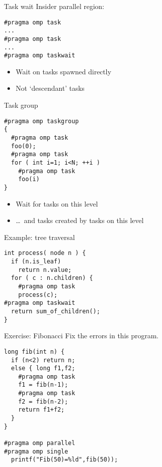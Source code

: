 \begin{numberedframe}{Task wait}
Insider parallel region:
\begin{lstlisting}
#pragma omp task
...
#pragma omp task
...
#pragma omp taskwait
\end{lstlisting}
  \begin{itemize}
  \item Wait on tasks spawned directly
  \item Not `descendant' tasks
  \end{itemize}
\end{numberedframe}

\begin{numberedframe}{Task group}
\begin{lstlisting}
#pragma omp taskgroup
{
  #pragma omp task
  foo(0);
  #pragma omp task
  for ( int i=1; i<N; ++i )
    #pragma omp task
    foo(i)
}
\end{lstlisting}
  \begin{itemize}
  \item Wait for tasks on this level
  \item \ldots~and tasks created by tasks on this level
  \end{itemize}
\end{numberedframe}

\begin{numberedframe}{Example: tree traversal}
\begin{lstlisting}
int process( node n ) {
  if (n.is_leaf)
    return n.value;
  for ( c : n.children) {
    #pragma omp task
    process(c);
#pragma omp taskwait
  return sum_of_children();
}
\end{lstlisting}
\end{numberedframe}

\begin{numberedframe}{Exercise: Fibonacci}
  Fix the errors in this program.
\begin{lstlisting}
long fib(int n) {
  if (n<2) return n;
  else { long f1,f2;
    #pragma omp task
    f1 = fib(n-1);
    #pragma omp task
    f2 = fib(n-2);
    return f1+f2;
  }
}

#pragma omp parallel
#pragma omp single
  printf("Fib(50)=%ld",fib(50));
\end{lstlisting}
\end{numberedframe}

